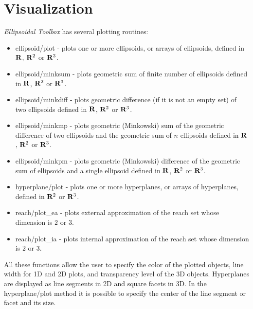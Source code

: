 \documentclass[letterpaper,10pt,english]{sphinxmanual}
\begin{document}
\section{Visualization}
\label{chap_implement:visualization}
\emph{Ellipsoidal Toolbox} has several plotting routines:
\begin{itemize}
\item {} 
ellipsoid/plot - plots one or more ellipsoids, or arrays of
ellipsoids, defined in \({\bf R}\), \({\bf R}^2\) or
\({\bf R}^3\).

\item {} 
ellipsoid/minksum - plots geometric sum of finite number of
ellipsoids defined in \({\bf R}\), \({\bf R}^2\) or
\({\bf R}^3\).

\item {} 
ellipsoid/minkdiff - plots geometric difference (if it is not an
empty set) of two ellipsoids defined in \({\bf R}\),
\({\bf R}^2\) or \({\bf R}^3\).

\item {} 
ellipsoid/minkmp - plots geometric (Minkowski) sum of the geometric
difference of two ellipsoids and the geometric sum of \(n\)
ellipsoids defined in \({\bf R}\), \({\bf R}^2\) or
\({\bf R}^3\).

\item {} 
ellipsoid/minkpm - plots geometric (Minkowski) difference of the
geometric sum of ellipsoids and a single ellipsoid defined in
\({\bf R}\), \({\bf R}^2\) or \({\bf R}^3\).

\item {} 
hyperplane/plot - plots one or more hyperplanes, or arrays of
hyperplanes, defined in \({\bf R}^2\) or \({\bf R}^3\).

\item {} 
reach/plot\_ea - plots external approximation of the reach set whose
dimension is \(2\) or \(3\).

\item {} 
reach/plot\_ia - plots internal approximation of the reach set whose
dimension is \(2\) or \(3\).

\end{itemize}

All these functions allow the user to specify the color of the plotted
objects, line width for 1D and 2D plots, and transparency level of the
3D objects. Hyperplanes are displayed as line segments in 2D and square
facets in 3D. In the hyperplane/plot method it is possible to specify
the center of the line segment or facet and its size.
\end{document}
